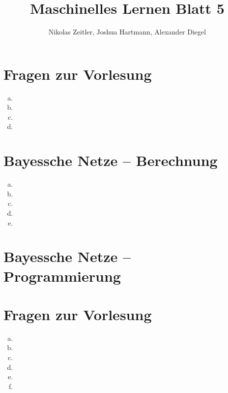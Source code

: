 \documentclass[a4paper]{scrartcl}
\author{Nikolas Zeitler, Joshua Hartmann, Alexander Diegel}
\title{Maschinelles Lernen Blatt 5}
\begin{document}
\maketitle
\section{Fragen zur Vorlesung}

\begin{enumerate}[a)]
	\item 
	\item 
	\item 
	\item 
\end{enumerate}


\section{Bayessche Netze – Berechnung}

\begin{enumerate}[(a)]
	\item 
	\item 
	\item 
	\item 
	\item 
\end{enumerate}


\section{Bayessche Netze – Programmierung}



\section{Fragen zur Vorlesung}

\begin{enumerate}[(a)]
	\item 
	\item 
	\item 
	\item 
	\item 
	\item 
\end{enumerate}
\end{document}
